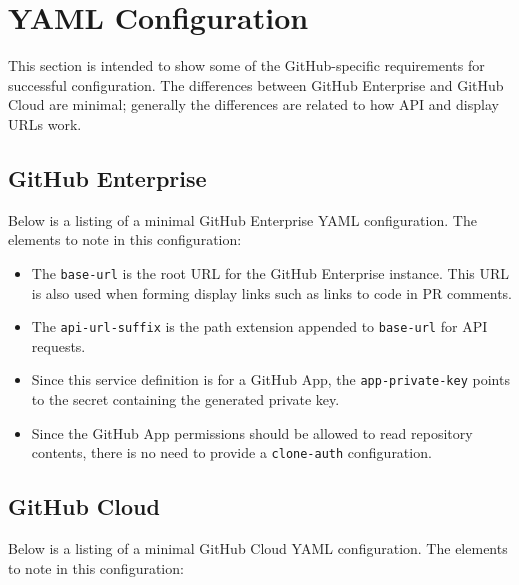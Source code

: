 \FloatBarrier

\section{\cxoneflow YAML Configuration}\label{sec:gh-yaml-config}

This section is intended to show some of the GitHub-specific requirements for successful configuration.  The differences
between GitHub Enterprise and GitHub Cloud are minimal; generally the differences are related to how API and display URLs
work.

\subsection{GitHub Enterprise}

Below is a listing of a minimal GitHub Enterprise YAML configuration.  The elements to note in this
configuration:

\begin{itemize}
    \item The \texttt{base-url} is the root URL for the GitHub Enterprise instance.  This URL is also used
    when forming display links such as links to code in PR comments.
    \item The \texttt{api-url-suffix} is the path extension appended to \texttt{base-url} for API requests.
    \item Since this service definition is for a GitHub App, the \texttt{app-private-key} points to the secret
    containing the generated private key.
    \item Since the GitHub App permissions should be allowed to read repository contents, there is no need
    to provide a \texttt{clone-auth} configuration.
\end{itemize}



\subsection{GitHub Cloud}

Below is a listing of a minimal GitHub Cloud YAML configuration.  The elements to note in this
configuration:

